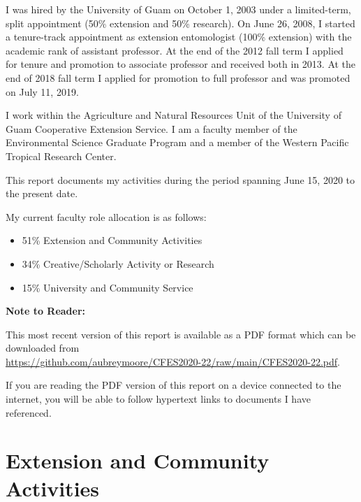 I was hired by the University of Guam on October 1, 2003 under a limited-term,
split appointment (50\% extension and 50\% research). On June 26,
2008, I started a tenure-track appointment as extension entomologist
(100\% extension) with the academic rank of assistant professor. At
the end of the 2012 fall term I applied for tenure and promotion to associate professor and
received both in 2013. At the end of 2018 fall term I applied for promotion to
full professor and was promoted on July 11, 2019. 

I work within the Agriculture and Natural Resources Unit of the University
of Guam Cooperative Extension Service. I am a faculty member of the
Environmental Science Graduate Program and a member of the Western
Pacific Tropical Research Center. 

This report documents my activities during the period spanning June 15, 2020 to the present date.

My current faculty role allocation is as follows:
\begin{itemize}
	\item 51\% Extension and Community Activities 
	\item 34\% Creative/Scholarly Activity or Research 
	\item 15\% University and Community Service
\end{itemize}

\textbf{Note to Reader:}

This most recent version of this report is available as a PDF format which can be downloaded from \\
\url{https://github.com/aubreymoore/CFES2020-22/raw/main/CFES2020-22.pdf}. 

If you are reading the PDF version of this report on a device connected
to the internet, you will be able to follow hypertext links to documents
I have referenced.

\pagebreak

\section{Extension and Community Activities}

